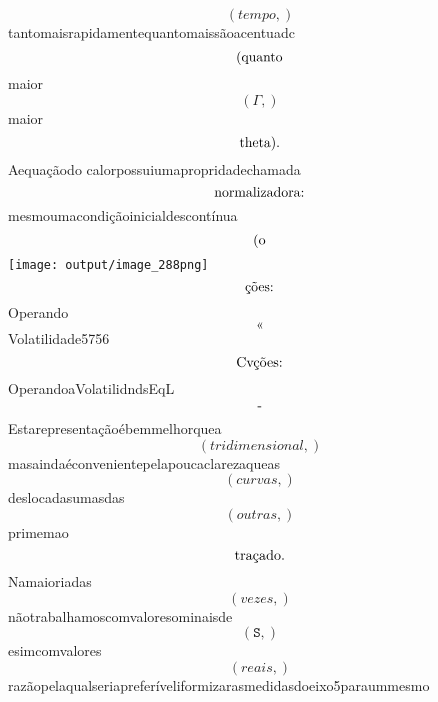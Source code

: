 \documentclass{article}
\begin{document}
\begin{equation}
\left( tempo,\right)
\end{equation}tantomaisrapidamentequantomaissãoacentuadc\begin{equation}
$(quanto$
\end{equation}maior\begin{equation}
\left( \Gamma,\right)
\end{equation}maior\begin{equation}
$theta).$
\end{equation}Aequaçãodo calorpossuiumapropridadechamada\begin{equation}
$normalizadora:$
\end{equation}mesmoumacondiçãoinicialdescontínua\begin{equation}
$(o$
\end{equation}\texttt{[image: output/image\_288png]}\begin{equation}
$ções:$
\end{equation}Operando\begin{equation}
«
\end{equation}Volatilidade5756\begin{equation}
$Cvções:$
\end{equation}OperandoaVolatilidndsEqL\begin{equation}
$-$
\end{equation}Estarepresentaçãoébemmelhorquea\begin{equation}
\left( tridimensional,\right)
\end{equation}masaindaéconvenientepelapoucaclarezaqueas\begin{equation}
\left( curvas,\right)
\end{equation}deslocadasumasdas\begin{equation}
\left( outras,\right)
\end{equation}primemao\begin{equation}
$traçado.$
\end{equation}Namaioriadas\begin{equation}
\left( vezes,\right)
\end{equation}nãotrabalhamoscomvaloresominaisde\begin{equation}
\left( \mathtt{\text{S}},\right)
\end{equation}esimcomvalores\begin{equation}
\left( reais,\right)
\end{equation}razãopelaqualseriapreferíveliformizarasmedidasdoeixo5paraummesmo\begin{equation}

\end{equation}
\end{document}
